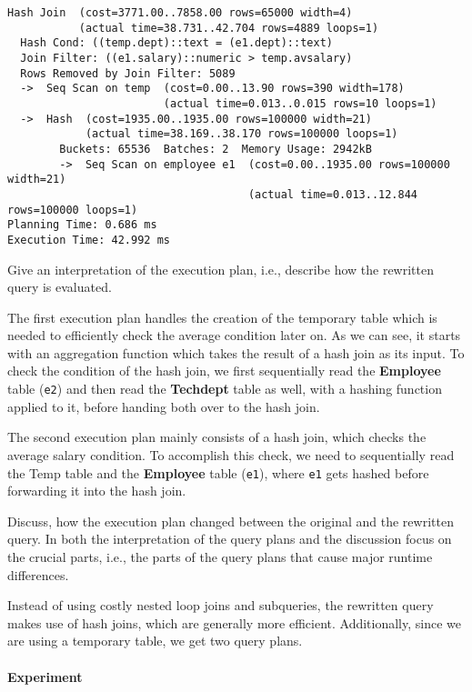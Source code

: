 \documentclass[11pt]{scrartcl}
\begin{document}
            {\small
    \parskip0pt\begin{verbatim}
Hash Join  (cost=3771.00..7858.00 rows=65000 width=4)
           (actual time=38.731..42.704 rows=4889 loops=1)
  Hash Cond: ((temp.dept)::text = (e1.dept)::text)
  Join Filter: ((e1.salary)::numeric > temp.avsalary)
  Rows Removed by Join Filter: 5089
  ->  Seq Scan on temp  (cost=0.00..13.90 rows=390 width=178)
                        (actual time=0.013..0.015 rows=10 loops=1)
  ->  Hash  (cost=1935.00..1935.00 rows=100000 width=21)
            (actual time=38.169..38.170 rows=100000 loops=1)
        Buckets: 65536  Batches: 2  Memory Usage: 2942kB
        ->  Seq Scan on employee e1  (cost=0.00..1935.00 rows=100000 width=21)
                                     (actual time=0.013..12.844 rows=100000 loops=1)
Planning Time: 0.686 ms
Execution Time: 42.992 ms
    \end{verbatim}}

    Give an interpretation of the execution plan, i.e., describe how the rewritten query is evaluated.

    The first execution plan handles the creation of the temporary table which is needed to efficiently check the
    average condition later on.
    As we can see, it starts with an aggregation function which takes the result of a hash join as its input.
    To check the condition of the hash join, we first sequentially read the \textbf{Employee} table (\texttt{e2}) and then read the
    \textbf{Techdept} table as well, with a hashing function applied to it, before handing both over to the hash join.

    The second execution plan mainly consists of a hash join, which checks the average salary condition.
    To accomplish this check, we need to sequentially read the Temp table and the \textbf{Employee} table (\texttt{e1}),
    where \texttt{e1} gets hashed before forwarding it into the hash join.

    Discuss, how the execution plan changed between the original and the rewritten query.
    In both the interpretation of the query plans and the discussion focus on the crucial parts, i.e., the parts of the
    query plans that cause major runtime differences.

    Instead of using costly nested loop joins and subqueries, the rewritten query makes use of hash joins, which are
    generally more efficient.
    Additionally, since we are using a temporary table, we get two query plans.

    \paragraph{Experiment}
\end{document}
